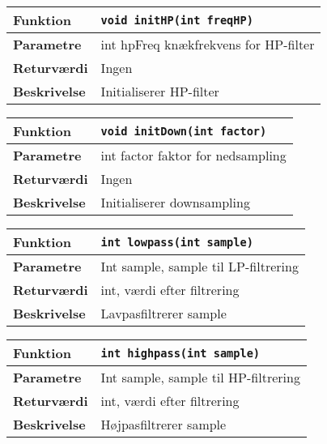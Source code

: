 \begin{center}
    \begin{tabular}{ | l | p{} |}
    \hline
    \textbf{Funktion}	& \verb+void initHP(int freqHP) +						\\ \hline
    \textbf{Parametre} 	& int hpFreq knækfrekvens for HP-filter		\\ \hline
    \textbf{Returværdi}	& Ingen 								\\ \hline
    \textbf{Beskrivelse}	& Initialiserer HP-filter		\\ \hline
    \end{tabular}
\end{center}

\begin{center}
    \begin{tabular}{ | l | p{} |}
    \hline
    \textbf{Funktion}	& \verb+void initDown(int factor) +						\\ \hline
    \textbf{Parametre} 	& int factor faktor for nedsampling		\\ \hline
    \textbf{Returværdi}	& Ingen 								\\ \hline
    \textbf{Beskrivelse}	& Initialiserer downsampling		\\ \hline
    \end{tabular}
\end{center}

\begin{center}
    \begin{tabular}{ | l | p{} |}
    \hline
    \textbf{Funktion}	& \verb+int lowpass(int sample) +						\\ \hline
    \textbf{Parametre} 	& Int sample, sample til LP-filtrering		\\ \hline
    \textbf{Returværdi}	& int, værdi efter filtrering 								\\ \hline
    \textbf{Beskrivelse}& Lavpasfiltrerer sample		\\ \hline
    \end{tabular}
\end{center}

\begin{center}
    \begin{tabular}{ | l | p{} |}
    \hline
    \textbf{Funktion}	& \verb+int highpass(int sample) +						\\ \hline
    \textbf{Parametre} 	& Int sample, sample til HP-filtrering		\\ \hline
    \textbf{Returværdi}	& int, værdi efter filtrering 								\\ \hline
    \textbf{Beskrivelse}& Højpasfiltrerer sample		\\ \hline
    \end{tabular}
\end{center}

